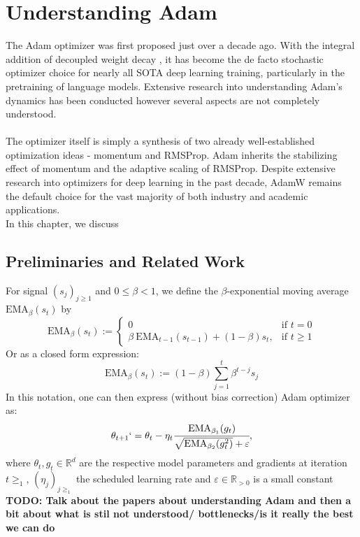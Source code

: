 \documentclass[12pt]{book}
\newcommand{\R}{\mathbb{R}}
\newcommand{\todo}[1]{{\color{red}\bf{TODO: #1}}}
\begin{document}
\chapter{Understanding Adam}
\label{chap: Understanding Adam}
The Adam optimizer \cite{kingma2017adammethodstochasticoptimization} was first proposed just over a decade ago. With the integral addition of decoupled weight decay \cite{loshchilov2019decoupledweightdecayregularization}, it has become the de facto stochastic optimizer choice for nearly all SOTA deep learning training, particularly in the pretraining of language models.  Extensive research into understanding Adam's dynamics has been conducted however several aspects are not completely understood. \\
\\
The optimizer itself is simply a synthesis of two already well-established optimization ideas - momentum and RMSProp. Adam inherits the stabilizing effect of momentum  and the adaptive scaling of RMSProp.  
Despite extensive research into optimizers for deep learning in the past decade, AdamW remains the default choice for the vast majority of both industry and academic applications. \\
In this chapter, we discuss 

\section{Preliminaries and Related Work}
For signal $(s_{j})_{j\ge 1} $ and $0\le\beta < 1$, we define the $\beta$-exponential moving average $\text{EMA}_{\beta}(s_{t})$ by 
\[
 \text{EMA}_{\beta}(s_t) := \begin{cases}
	 0 \quad &\text{if } t=0
 \\
	 \beta \ \text{EMA}_{t-1}(s_{t-1}) + (1-\beta)s_t, &\text{if } t\ge 1
 \end{cases}
\]
Or as a closed form expression:
\[
	\text{EMA}_{\beta}(s_t) := (1-\beta) \sum_{j=1}^{t} {\beta^{t-j}s_j}
\] 
In this notation, one can then express (without bias correction) Adam optimizer \footnotemark{} as:
\[
	\theta_{t+1}` = \theta_t - \eta_t \cfrac{\text{EMA}_{\beta_1}(g_t)}{\sqrt{\text{EMA}_{\beta_2}(g_t^2)} + \varepsilon  }, 
\]
where $\theta_t, g_t \in\R^{d}$ are the respective model parameters and gradients at iteration $t\ge_1$, $(\eta_{j})_{j\ge_1} $ the scheduled learning rate and  $\varepsilon \in\R_{>0}$ is a small constant
\todo{Talk about the papers about understanding Adam and then a bit about what is stil not understood/ bottlenecks/is it really the best we can do}
\end{document}
